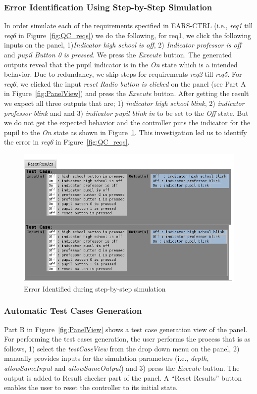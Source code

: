 \subsubsection{Error Identification Using Step-by-Step Simulation}
In order simulate each of the requirements specified in EARS-CTRL (i.e.,
\emph{req1} till \emph{req6} in Figure~\ref{fig:QC_reqs}) we do the following, for req1,  we click the
following inputs on the panel, 1)\emph{Indicator high school is off}, 2)
\emph{Indicator professor is off} and \emph{pupil Button 0 is pressed}. We press
the \emph{Execute} button. The generated outputs reveal that the pupil indicator
is in the \emph{On} state which is a intended behavior. Due to
redundancy, we skip steps for requirements \emph{req2} till \emph{req5}. For
\emph{req6}, we clicked the input \textsf{\emph{reset Radio button is clicked}} on the panel (see \textsf{Part A} in Figure~\ref{fig:PanelView}) and press the \emph{Execute} button. After
getting the result we expect all three outputs that are; 1) \emph{
indicator high school blink}, 2) \emph{indicator professor blink} and and 3)
\emph{indicator pupil blink in} to be set to the \emph{Off} state. But we
do not get the expected behavior and the controller puts the indicator for the
pupil to the \emph{On} state as shown in Figure~\ref{fig:simError}. This
investigation led us to identify the error in \emph{req6} in
Figure~\ref{fig:QC_reqs}.
\begin{figure}[!h]
\centering
\includegraphics[width=.7\textwidth]{./images/Simulation_Error.png}
\caption{Error Identified during step-by-step simulation}
\label{fig:simError}
\vspace{-.6cm}
\end{figure}
\subsubsection{Automatic Test Cases Generation} 
\vspace{-.5cm}
\textsf{Part B} in Figure~\ref{fig:PanelView} shows a
test case generation view of the panel. For performing the test cases
generation, the user performs the process that is as follows, 1) select the
\textsf{\emph{testCaseView}} from the drop down menu on the panel, 2)
manually provides inputs for the simulation parameters (i.e., \emph{depth},
\emph{allowSameInput} and \emph{allowSameOutput}) and 3) press the
\emph{Execute} button.
The output is added to \textsf{Result checker} part of the panel. A \textsf{“Reset Results”} button enables the user to reset the controller to its initial state.
